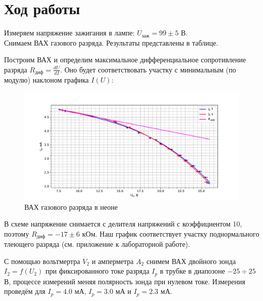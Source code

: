 \documentclass[a4paper, 10pt]{article}
\begin{document}
        \section*{Ход работы}
        Измеряем напряжение зажигания в лампе: $U_{\text{заж}} = 99\pm5 $ В.\\
        Снимаем ВАХ газового разряда. Результаты представлены в таблице.

        Построим ВАХ и определим максимальное дифференциальное сопротивление разряда $R_{\text{диф}} = \frac{dU}{dI}$. Оно будет соответствовать участку с минимальным (по модулю) наклоном графика $I(U)$:

        \begin{figure}[h!]
        	\centering
        	\includegraphics[width = \textwidth]{vah.pdf}
        	\caption{ВАХ газового разряда в неоне}
        \end{figure}
        В схеме напряжение снимается с делителя напряжений с коэффициентом 10, поэтому $R_{\text{диф}} = -17 \pm 6$ кОм. Наш график соответствует участку поднормального тлеющего разряда (см. приложение к лабораторной работе).

        С помощью вольтмертра $V_2$ и амперметра $A_2$ снимем ВАХ двойного зонда $I_2 = f(U_2)$ при фиксированного токе разряда $I_p$ в трубке в диапозоне $-25 \div 25$ В, процессе измерений меняя полярность зонда при нулевом токе. Измерения проведём для $I_p = 4.0$ мА, $I_p = 3.0$ мА  и $I_p = 2.3$ мА.
\end{document}
